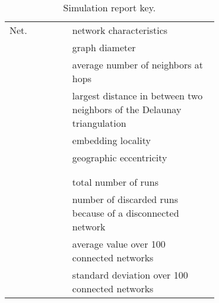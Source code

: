 \documentclass{article}
\renewcommand{\arraystretch}{1.5}
\begin{document}
\begin{table}[h]
\begin{center}
\small
\renewcommand{\arraystretch}{1.1}
\begin{tabular}{l p{0.7\linewidth}}
\hline
Net. & network characteristics\\
 & graph diameter\\
 & average number of neighbors at  hops\\
 & largest distance in  between two neighbors of the Delaunay triangulation\\
 & embedding locality\\
 & geographic eccentricity\\
 & \\
 & \\
\hline
 & total number of runs\\
 & number of discarded runs because of a disconnected network\\
 & average value over 100 connected networks\\
 & standard deviation over 100 connected networks\\
\hline
\end{tabular}
\end{center}
\caption{Simulation report key.}
\label{tab_key}
\end{table}

\renewcommand{\arraystretch}{1}
\small
\end{document}
